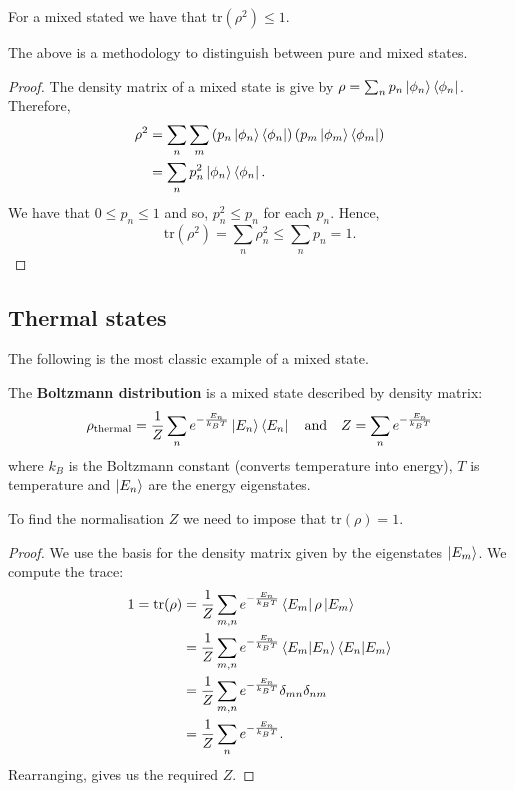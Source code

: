 \documentclass[12pt, a4paper]{article}
\begin{document}
\begin{theorem}
    For a mixed stated we have that \(\text{tr}(\rho^2)\leq 1\).
\end{theorem}

\begin{mdnote}
    The above is a methodology to distinguish between pure and mixed states.
\end{mdnote}

\begin{proof}
    The density matrix of a mixed state is give by \(\rho = \sum_n p_n \ket{\phi_n} \bra{\phi_n}\). Therefore,
    \[\begin{aligned}
        \rho^2 &= \sum_n\sum_m \left(  p_n \ket{\phi_n} \bra{\phi_n} \right) \left( p_m \ket{\phi_m} \bra{\phi_m} \right) \\
        &= \sum_n p_n^2 \ket{\phi_n}\bra{\phi_n}.
    \end{aligned}\]
    We have that \(0 \leq p_n \leq 1\) and so, \(p_n^2 \leq p_n\) for each \(p_n\). Hence, 
    \[\text{tr}(\rho^2) = \sum_n \rho^2_n \leq \sum_n p_n =1.\]
\end{proof}

\subsection{Thermal states}

The following is the most classic example of a mixed state. 

\begin{definition}
    The \textbf{Boltzmann distribution} is a mixed state described by density matrix:
    \[\rho_{\text{thermal}} = \frac{1}{Z} \sum_n e^{-\frac{E_n}{k_B T}} \ket{E_n}\bra{E_n} \quad \text{and} \quad Z = \sum_n e^{-\frac{E_n}{k_B T}}\]
    where \(k_B\) is the Boltzmann constant (converts temperature into energy), \(T\) is temperature and \(\ket{E_n}\) are the energy eigenstates. 
\end{definition}

\begin{mdnote}
    To find the normalisation \(Z\) we need to impose that \(\text{tr}(\rho)=1\).
    \begin{proof}
        We use the basis for the density matrix given by the eigenstates \(\ket{E_m}\). We compute the trace:
        \[\begin{aligned}
            1 = \text{tr}(\rho) &= \frac{1}{Z} \sum_{m,n} e^{-\frac{E_n}{k_B T}} \bra{E_m} \rho \ket{E_m}  \\
            &=\frac{1}{Z} \sum_{m,n} e^{-\frac{E_n}{k_B T}} \bra{E_m} \ket{E_n}\bra{E_n} \ket{E_m} \\
            &= \frac{1}{Z} \sum_{m,n} e^{-\frac{E_n}{k_B T}} \delta_{mn}\delta_{nm} \\ 
            &= \frac{1}{Z} \sum_n e^{-\frac{E_n}{k_B T}} .
        \end{aligned}\]
        Rearranging, gives us the required \(Z\).
    \end{proof}
\end{mdnote}
\end{document}
